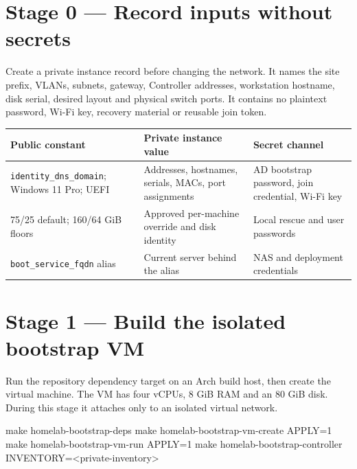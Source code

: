 \section{Stage 0 --- Record inputs without secrets}

Create a private instance record before changing the network. It names the
site prefix, VLANs, subnets, gateway, Controller addresses, workstation
hostname, disk serial, desired layout and physical switch ports. It contains
no plaintext password, Wi-Fi key, recovery material or reusable join token.

\begin{tabularx}{\linewidth}{@{}p{.25\linewidth}p{.33\linewidth}L@{}}
\toprule
\textbf{Public constant} & \textbf{Private instance value} & \textbf{Secret channel}\\
\midrule
\texttt{identity\_dns\_domain}; Windows 11 Pro; UEFI & Addresses, hostnames, serials, MACs, port assignments & AD bootstrap password, join credential, Wi-Fi key\\
75/25 default; 160/64 GiB floors & Approved per-machine override and disk identity & Local rescue and user passwords\\
\texttt{boot\_service\_fqdn} alias & Current server behind the alias & NAS and deployment credentials\\
\bottomrule
\end{tabularx}


\section{Stage 1 --- Build the isolated bootstrap VM}

Run the repository dependency target on an Arch build host, then create the
virtual machine. The VM has four vCPUs, 8 GiB RAM and an 80 GiB disk. During
this stage it attaches only to an isolated virtual network.

\begin{shellblock}
make homelab-bootstrap-deps
make homelab-bootstrap-vm-create APPLY=1
make homelab-bootstrap-vm-run APPLY=1
make homelab-bootstrap-controller INVENTORY=<private-inventory>
\end{shellblock}


